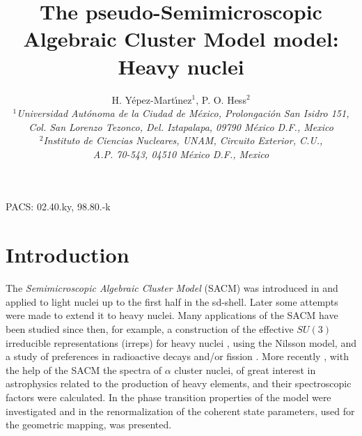 \documentclass[12pt]{article}
\begin{document}
\def\ii{\'\i}


\title{
The pseudo-Semimicroscopic Algebraic Cluster Model model: Heavy nuclei
}

\author{H. Y\'epez-Mart\ii nez$^1$, P. O. Hess$^2$ \\
{\small\it
$^1$Universidad Aut\'onoma de la Ciudad de M\'exico,
Prolongaci\'on San Isidro 151,} \\
{\small\it
Col. San Lorenzo Tezonco, Del. Iztapalapa,
09790 M\'exico D.F., Mexico} \\
{\small\it
$^2$Instituto de Ciencias Nucleares, UNAM, Circuito Exterior, C.U.,}\\ 
{\small\it A.P. 70-543, 04510 M\'exico D.F., Mexico} }


\maketitle
{}
\vskip 0.5cm
\noindent
PACS: 02.40.ky, 98.80.-k


\vskip 1cm



\section{Introduction}
\label{intro}

The {\it Semimicroscopic Algebraic Cluster Model} (SACM) was introduced in
\cite{cseh-letter, cseh-levai-anph} and applied to light nuclei up to the
first half in the sd-shell.  Later some attempts were made to extend it to heavy nuclei.
Many applications of the SACM have been studied since then, for example, a construction of the effective $SU(3)$ irreducible
representations (irreps)  for heavy nuclei \cite{hunyadi}, using the 
Nilsson model, and a study of preferences in radioactive decays and/or fission
\cite{sacm-fission1,sacm-fission2,sacm-fission3}.   
More recently \cite{hess-86}, with the help of the SACM the 
spectra of
$\alpha$ cluster nuclei, of great interest in astrophysics related to the production  
of heavy elements, and their spectroscopic factors were calculated. In \cite{phase-I,phase-II}
the phase transition properties of the model were investigated and in \cite{renorm}
the renormalization of the coherent state parameters, used for the geometric
mapping, was presented.
\end{document}
